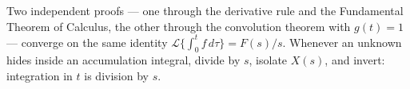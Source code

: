 \documentclass[11pt]{article}
\begin{document}
\begin{conceptbox}
Two independent proofs --- one through the \textcolor{accentorange}{derivative rule and the Fundamental Theorem of Calculus}, the other through the \textcolor{accentorange}{convolution theorem with $g(t)=1$} --- converge on the same identity $\mathcal{L}\{\int_0^t f\,d\tau\} = F(s)/s$. Whenever an unknown hides inside an accumulation integral, divide by $s$, isolate $X(s)$, and invert: \textcolor{accentorange}{integration in $t$ is division by $s$}.
\end{conceptbox}
\end{document}
